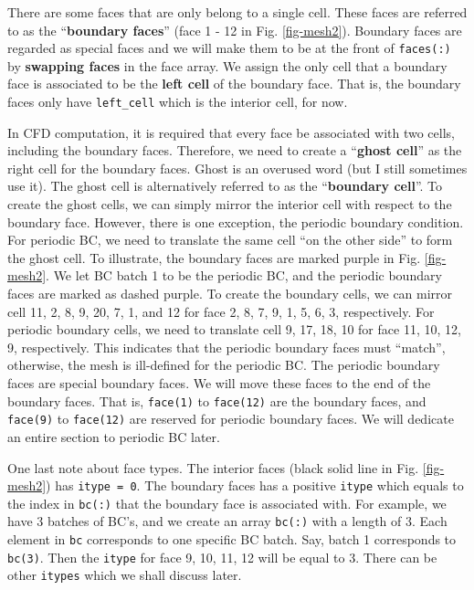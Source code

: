 \documentclass[11pt, letterpaper]{report}
\begin{document}
There are some faces that are only belong to a single cell. These faces are referred to as the
``{\bf boundary faces}'' (face 1 - 12 in Fig. \ref{fig-mesh2}). Boundary faces are regarded as
special faces and we will make them to be at the front of \verb+faces(:)+ by {\bf swapping faces} in the
face array. We assign the only cell
that a boundary face is associated to be the {\bf left cell} of the boundary face. That is, the
boundary faces only have \verb+left_cell+ which is the interior cell, for now.
\paraspace

In CFD computation, it is required that every face be associated with two cells, including the
boundary faces. Therefore, we need to create a ``{\bf ghost cell}'' as the right cell for the
boundary faces. Ghost is an overused word (but I still sometimes use it). The ghost cell is
alternatively referred to as the ``{\bf boundary cell}''. To create the ghost cells, we can simply
mirror the interior cell with respect to the boundary face. However, there is one exception, the
periodic boundary condition. For periodic BC, we need to translate the same cell ``on the other
side'' to form the ghost cell. To illustrate, the boundary faces are marked purple in Fig.
\ref{fig-mesh2}. We let BC batch 1 to be the periodic BC, and the periodic boundary faces are marked
as dashed purple. To create the boundary cells, we can mirror cell 11, 2, 8, 9, 20, 7, 1, and 12 for
face 2, 8, 7, 9, 1, 5, 6,  3, respectively. For periodic boundary cells, we need to translate cell
9, 17, 18, 10 for face 11, 10, 12, 9, respectively. This indicates that the periodic boundary faces
must ``match'', otherwise, the mesh is ill-defined for the periodic BC. The periodic boundary faces
are special boundary faces. We will move these faces to the end of the boundary faces. That is,
\verb+face(1)+ to \verb+face(12)+ are the boundary faces, and \verb+face(9)+ to \verb+face(12)+ are
reserved for periodic boundary faces.  We will dedicate an entire section to periodic BC later.
\paraspace

One last note about face types. The interior faces (black solid line in Fig. \ref{fig-mesh2}) has
\verb+itype = 0+. The boundary faces has a positive \verb+itype+ which equals to the index in
\verb+bc(:)+ that the boundary face is associated with. For example, we have 3 batches of BC's, and
we create an array \verb+bc(:)+ with a length of 3. Each element in \verb+bc+ corresponds to one
specific BC batch. Say, batch 1 corresponds to \verb+bc(3)+. Then the \verb+itype+ for face 9, 10, 11,
12 will be equal to 3. There can be other \verb+itypes+ which we shall discuss later.
\paraspace
\end{document}
